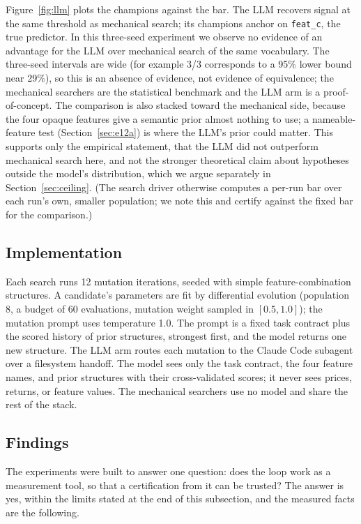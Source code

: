 \documentclass[11pt]{article}
\newcommand{\code}[1]{\texttt{#1}}
\begin{document}
Figure~\ref{fig:llm} plots the champions against the bar.
The LLM recovers signal at the same threshold as mechanical search; its champions anchor on
\code{feat\_c}, the true predictor. In this three-seed experiment we observe no evidence of an advantage
for the LLM over mechanical search of the same vocabulary. The three-seed intervals are wide (for
example 3/3 corresponds to a 95\% lower bound near 29\%), so this is an absence of evidence, not
evidence of equivalence; the mechanical searchers are the statistical benchmark and the LLM arm is a
proof-of-concept. The comparison is also stacked toward the mechanical side, because the four opaque
features give a semantic prior almost nothing to use; a nameable-feature test (Section~\ref{sec:e12a})
is where the LLM's prior could matter. This supports only the empirical statement, that the LLM did not
outperform mechanical search here, and not the stronger theoretical claim about hypotheses outside the
model's distribution, which we argue separately in Section~\ref{sec:ceiling}. (The search driver
otherwise computes a per-run bar over each run's own, smaller population; we note this and certify
against the fixed bar for the comparison.)

\subsection{Implementation}
\label{sec:impl}

Each search runs 12 mutation iterations, seeded with simple feature-combination structures. A
candidate's parameters are fit by differential evolution (population 8, a budget of 60 evaluations,
mutation weight sampled in $[0.5,1.0]$); the mutation prompt uses temperature 1.0. The prompt is a
fixed task contract plus the scored history of prior structures, strongest first, and the model
returns one new structure. The LLM arm routes each mutation to the Claude Code subagent over a
filesystem handoff. The model sees only the task contract, the four feature
names, and prior structures with their cross-validated scores; it never sees prices, returns, or
feature values. The mechanical searchers use no model and share the rest of the stack.

\subsection{Findings}
\label{sec:findings}

The experiments were built to answer one question: does the loop work as a measurement tool, so that a
certification from it can be trusted? The answer is yes, within the limits stated at the end of this
subsection, and the measured facts are the following.
\end{document}
